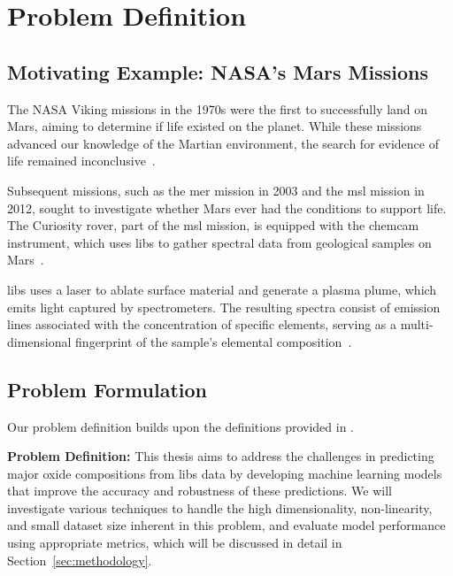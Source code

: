 \section{Problem Definition}\label{sec:problem_definition}

\subsection{Motivating Example: NASA's Mars Missions}
The NASA Viking missions in the 1970s were the first to successfully land on Mars, aiming to determine if life existed on the planet. 
While these missions advanced our knowledge of the Martian environment, the search for evidence of life remained inconclusive~\cite{marsnasagov_vikings}.

Subsequent missions, such as the \gls{mer} mission in 2003 and the \gls{msl} mission in 2012, sought to investigate whether Mars ever had the conditions to support life. 
The Curiosity rover, part of the \gls{msl} mission, is equipped with the \gls{chemcam} instrument, which uses \gls{libs} to gather spectral data from geological samples on Mars~\cite{wiensChemcam2012}.

\gls{libs} uses a laser to ablate surface material and generate a plasma plume, which emits light captured by spectrometers. 
The resulting spectra consist of emission lines associated with the concentration of specific elements, serving as a multi-dimensional fingerprint of the sample's elemental composition~\cite{cleggRecalibrationMarsScience2017}.

\subsection{Problem Formulation}

Our problem definition builds upon the definitions provided in \citet{p9_paper}.


\textbf{Problem Definition:} This thesis aims to address the challenges in predicting major oxide compositions from \gls{libs} data by developing machine learning models that improve the accuracy and robustness of these predictions. 
We will investigate various techniques to handle the high dimensionality, non-linearity, and small dataset size inherent in this problem, and evaluate model performance using appropriate metrics, which will be discussed in detail in Section~\ref{sec:methodology}.
